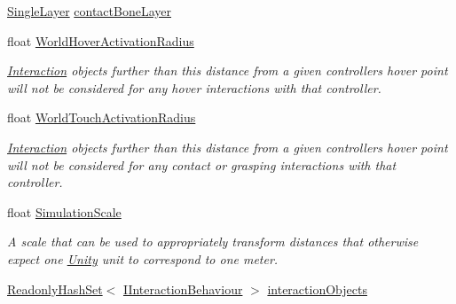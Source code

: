 \begin{DoxyCompactItemize}
\item 
\mbox{\hyperlink{struct_leap_1_1_unity_1_1_single_layer}{Single\+Layer}} \mbox{\hyperlink{class_leap_1_1_unity_1_1_interaction_1_1_interaction_manager_a8d638a6bce8faff14a6ceedf0d7cd9eb}{contact\+Bone\+Layer}}
\item 
float \mbox{\hyperlink{class_leap_1_1_unity_1_1_interaction_1_1_interaction_manager_a36150064a656dc0d048f5d234b8ff88f}{World\+Hover\+Activation\+Radius}}
\begin{DoxyCompactList}\small\item\em \mbox{\hyperlink{namespace_leap_1_1_unity_1_1_interaction}{Interaction}} objects further than this distance from a given controller\textquotesingle{}s hover point will not be considered for any hover interactions with that controller. \end{DoxyCompactList}\item 
float \mbox{\hyperlink{class_leap_1_1_unity_1_1_interaction_1_1_interaction_manager_af4c1780a031a91b3dac0846a5577be26}{World\+Touch\+Activation\+Radius}}
\begin{DoxyCompactList}\small\item\em \mbox{\hyperlink{namespace_leap_1_1_unity_1_1_interaction}{Interaction}} objects further than this distance from a given controller\textquotesingle{}s hover point will not be considered for any contact or grasping interactions with that controller. \end{DoxyCompactList}\item 
float \mbox{\hyperlink{class_leap_1_1_unity_1_1_interaction_1_1_interaction_manager_a129650833ce143b39615e9f2906a3669}{Simulation\+Scale}}
\begin{DoxyCompactList}\small\item\em A scale that can be used to appropriately transform distances that otherwise expect one \mbox{\hyperlink{namespace_leap_1_1_unity}{Unity}} unit to correspond to one meter. \end{DoxyCompactList}\item 
\mbox{\hyperlink{struct_leap_1_1_unity_1_1_readonly_hash_set}{Readonly\+Hash\+Set}}$<$ \mbox{\hyperlink{interface_leap_1_1_unity_1_1_interaction_1_1_i_interaction_behaviour}{I\+Interaction\+Behaviour}} $>$ \mbox{\hyperlink{class_leap_1_1_unity_1_1_interaction_1_1_interaction_manager_ad34f64a6e84ba3bed98a4f386857d4e2}{interaction\+Objects}}

\end{DoxyCompactItemize}
